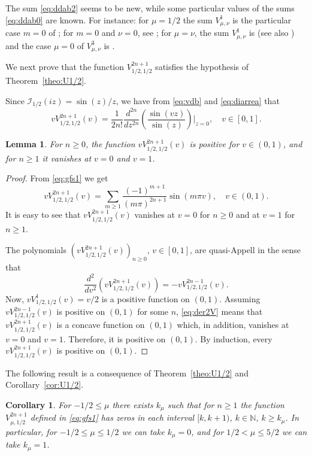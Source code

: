 \documentclass[10pt,a4paper]{article}
\numberwithin{equation}{section}
\theoremstyle{plain}
\newtheorem{Cor}[Theo]{Corollary}
\newtheorem{Lem}[Theo]{Lemma}
\theoremstyle{definition}
\newcommand{\I}{\mathcal{I}}
\newcommand{\NN}{\mathbb{N}}
\begin{document}
The sum \eqref{eq:ddab2} seems to be new, while some particular values of the sums \eqref{eq:ddab0} are known. For instance: for $\mu=1/2$ the sum $V_{\mu,\nu}^1$ is the particular case $m=0$ of \cite[sum (26)]{Rawn}; for $m=0$ and $\nu =0$, see \cite[(13), p.~691]{PBM}; for $\mu=\nu$, the sum $V_{\mu,\nu}^1$ is \cite[(1), p.~690]{PBM} (see also \cite[12.12(1), p.~581]{Wat}) and the case $\mu=0$ of $V_{\mu,\nu}^3$ is \cite[(3), p.~690]{PBM}.

We next prove that the function $V_{1/2,1/2}^{2n+1}$ satisfies the hypothesis of Theorem~\ref{theo:U1/2}.

Since $\I_{1/2}(iz) = {\sin(z)}/{z}$,
we have from \eqref{eq:vdb} and \eqref{eq:diarrea} that
\[
   v V_{1/2,1/2}^{2n+1}(v) = \frac{1}{2n!}\frac{d^{2n}}{dz^{2n}}
   \left(\frac{\sin(vz)}{\sin(z)}\right)\Big|_{z=0},\quad v\in[0,1].
\]

\begin{Lem}
\label{lem:Vpos}
For $n\ge 0$, the function $vV_{1/2,1/2}^{2n+1}(v)$ is positive for $v\in (0,1)$, and for $n\ge 1$ it vanishes at $v=0$ and $v=1$.
\end{Lem}

\begin{proof}
From \eqref{eq:gfs1} we get
\[
   vV_{1/2,1/2}^{2n+1}(v)
   = \sum_{m\ge 1} \frac{(-1)^{m+1}}{(m\pi)^{2n+1}} \sin (m\pi v),
   \quad v\in (0,1).
\]
It is easy to see that $vV_{1/2,1/2}^{2n+1}(v)$ vanishes at $v=0$ for $n\ge 0$ and at $v=1$ for $n\ge 1$.

The polynomials $(vV_{1/2,1/2}^{2n+1}(v))_{n\ge 0}$, $v\in [0,1]$, are quasi-Appell in the sense that
\begin{equation}
\label{eq:der2V}
   \frac{d^2}{dv^2} \left( vV_{1/2,1/2}^{2n+1}(v) \right) = -vV_{1/2,1/2}^{2n-1}(v).
\end{equation}
Now, $vV_{1/2,1/2}^{1}(v)=v/2$ is a positive function on $(0,1)$. Assuming $vV_{1/2,1/2}^{2n-1}(v)$ is positive on $(0,1)$ for some $n$, \eqref{eq:der2V} means that $vV_{1/2,1/2}^{2n+1}(v)$ is a concave function on $(0,1)$ which, in addition, vanishes at $v=0$ and $v=1$. Therefore, it is positive on $(0,1)$. By induction, every $vV_{1/2,1/2}^{2n+1}(v)$ is positive on $(0,1)$.
\end{proof}

The following result is a consequence of Theorem~\ref{theo:U1/2} and Corollary~\ref{cor:U1/2}.

\begin{Cor}
For $-1/2\le \mu$ there exists $k_\mu$ such that for $n\ge 1$ the function $V_{\mu,1/2}^{2n+1}$ defined in \eqref{eq:gfs1} has zeros in each interval $[k,k+1)$, $k\in \NN$, $k\ge k_{\mu}$. In particular, for $-1/2\le \mu \le 1/2$ we can take $k_{\mu}=0$, and for $1/2< \mu \le 5/2$ we can take $k_{\mu}=1$.
\end{Cor}
\end{document}
